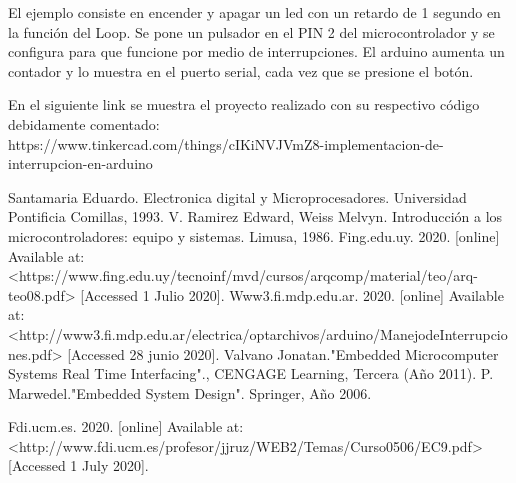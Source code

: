 \documentclass{article}
\begin{document}
El ejemplo consiste en encender y apagar un led con un retardo de 1 segundo en la función del Loop. Se pone un pulsador en el PIN 2 del microcontrolador y se configura para que funcione por medio de interrupciones. El arduino aumenta un contador y lo muestra en el puerto serial, cada vez que se presione el botón.

En el siguiente link se muestra el proyecto realizado con su respectivo código debidamente comentado:\\ https://www.tinkercad.com/things/cIKiNVJVmZ8-implementacion-de-interrupcion-en-arduino

\begin{thebibliography}{0}
   Santamaria Eduardo. Electronica digital y Microprocesadores. Universidad Pontificia Comillas, 1993.
   V. Ramirez Edward, Weiss Melvyn. Introducción a los microcontroladores: equipo y sistemas. Limusa, 1986.
   Fing.edu.uy. 2020. [online] Available at: <https://www.fing.edu.uy/tecnoinf/mvd/cursos/arqcomp/material/teo/arq-teo08.pdf> [Accessed 1 Julio 2020].
  Www3.fi.mdp.edu.ar. 2020. [online] Available at: <http://www3.fi.mdp.edu.ar/electrica/optarchivos/arduino/ManejodeInterrupciones.pdf> [Accessed  28 junio 2020].
   Valvano Jonatan."Embedded Microcomputer Systems Real Time Interfacing"., CENGAGE Learning, Tercera (Año 2011).
 P. Marwedel."Embedded System Design". Springer, Año 2006.
 
 Fdi.ucm.es. 2020. [online] Available at: <http://www.fdi.ucm.es/profesor/jjruz/WEB2/Temas/Curso0506/EC9.pdf> [Accessed 1 July 2020].
                           
\end{thebibliography}
\end{document}

